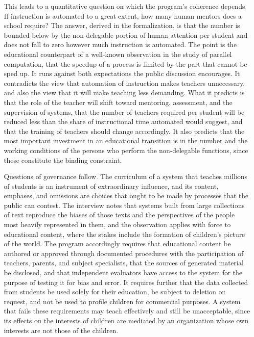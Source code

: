 This leads to a quantitative question on which the program's coherence depends. If instruction is automated to a great extent, how many human mentors does a school require? The answer, derived in the formalization, is that the number is bounded below by the non-delegable portion of human attention per student and does not fall to zero however much instruction is automated. The point is the educational counterpart of a well-known observation in the study of parallel computation, that the speedup of a process is limited by the part that cannot be sped up. It runs against both expectations the public discussion encourages. It contradicts the view that automation of instruction makes teachers unnecessary, and also the view that it will make teaching less demanding. What it predicts is that the role of the teacher will shift toward mentoring, assessment, and the supervision of systems, that the number of teachers required per student will be reduced less than the share of instructional time automated would suggest, and that the training of teachers should change accordingly. It also predicts that the most important investment in an educational transition is in the number and the working conditions of the persons who perform the non-delegable functions, since these constitute the binding constraint.

Questions of governance follow. The curriculum of a system that teaches millions of students is an instrument of extraordinary influence, and its content, emphases, and omissions are choices that ought to be made by processes that the public can contest. The interview notes that systems built from large collections of text reproduce the biases of those texts and the perspectives of the people most heavily represented in them, and the observation applies with force to educational content, where the stakes include the formation of children's picture of the world. The program accordingly requires that educational content be authored or approved through documented procedures with the participation of teachers, parents, and subject specialists, that the sources of generated material be disclosed, and that independent evaluators have access to the system for the purpose of testing it for bias and error. It requires further that the data collected from students be used solely for their education, be subject to deletion on request, and not be used to profile children for commercial purposes. A system that fails these requirements may teach effectively and still be unacceptable, since its effects on the interests of children are mediated by an organization whose own interests are not those of the children.

